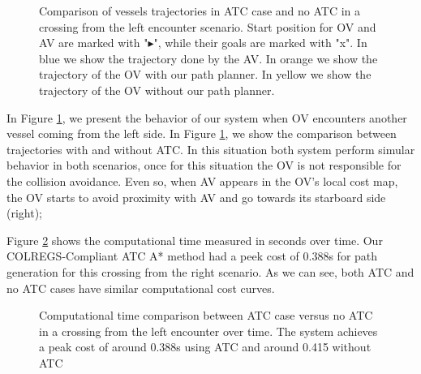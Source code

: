         \begin{figure}[H]
            \centering
            
            \caption{Comparison of vessels trajectories in \ac{ATC} case and no \ac{ATC} in a crossing from the left encounter scenario. Start position for \ac{OV} and \ac{AV} are marked with "$\blacktriangleright$", while their goals are marked with "x". In blue we show the trajectory done by the \ac{AV}. In orange we show the trajectory of the \ac{OV} with our path planner. In yellow we show the trajectory of the \ac{OV} without our path planner.}
            \label{fig:plot_ov_w_vs_wo}
        \end{figure}
        
        In Figure \ref{fig:plot_ov_w_vs_wo}, we present the behavior of our system when \ac{OV} encounters another vessel coming from the left side. In Figure \ref{fig:plot_ov_w_vs_wo}, we show the comparison between trajectories with and without \ac{ATC}. In this situation both system perform simular behavior in both scenarios, once for this situation the \ac{OV} is not responsible for the collision avoidance. Even so, when \ac{AV} appears in the \ac{OV}'s local cost map, the \ac{OV} starts to avoid proximity with \ac{AV} and go towards its starboard side (right);
        
        Figure \ref{fig:plot_ov_w_vs_wo_CT} shows the computational time measured in seconds over time. Our \ac{COLREGS}-Compliant \ac{ATC} A* method had a peek cost of 0.388s for path generation for this crossing from the right scenario. As we can see, both \ac{ATC} and no \ac{ATC} cases have similar computational cost curves.
        
        \begin{figure}[H]
            \centering
                
                \caption{Computational time comparison between \ac{ATC} case versus no \ac{ATC} in a crossing from the left encounter over time. The system achieves a peak cost of around 0.388s using \ac{ATC} and around 0.415 without \ac{ATC}}
                \label{fig:plot_ov_w_vs_wo_CT}
        \end{figure}
        
        
